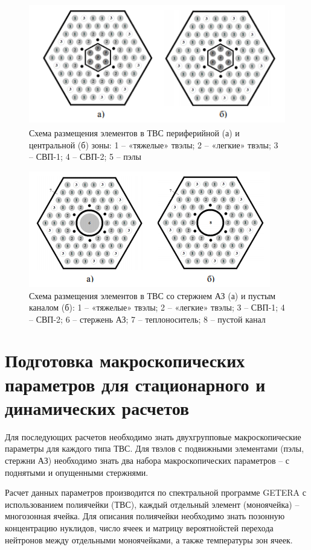 \begin{figure}[!h]
\center
\includegraphics[width=4.59375in,height=2.10972in]{media/image13.png}
\caption{Схема размещения элементов в ТВС периферийной (а) и
центральной (б) зоны: 1 -- «тяжелые» твэлы; 2 -- «легкие» твэлы; 3 --
СВП-1; 4 -- СВП-2; 5 -- пэлы}
\end{figure}

\begin{figure}[!h]
\center
\includegraphics[width=4.15625in,height=2.00000in]{media/image14.png}
\caption{Схема размещения элементов в ТВС со стержнем АЗ (а) и
пустым каналом (б): 1 -- «тяжелые» твэлы; 2 -- «легкие» твэлы; 3 --
СВП-1; 4 -- СВП-2; 6 -- стержень АЗ; 7 -- теплоноситель; 8 -- пустой
канал}
\end{figure}

\section{Подготовка макроскопических параметров для стационарного и
динамических расчетов}


Для последующих  расчетов необходимо знать двухгрупповые
макроскопические параметры для каждого типа ТВС. Для твэлов с подвижными
элементами (пэлы, стержни АЗ) необходимо знать два набора
макроскопических параметров -- с поднятыми и опущенными стержнями.

Расчет данных параметров производится по спектральной программе GETERA с
использованием полиячейки (ТВС), каждый отдельный элемент (моноячейка)
-- многозонная ячейка. Для описания полиячейки необходимо знать позонную
концентрацию нуклидов, число ячеек и матрицу вероятнойстей перехода
нейтронов между отдельными моноячейками, а также температуры зон ячеек.

